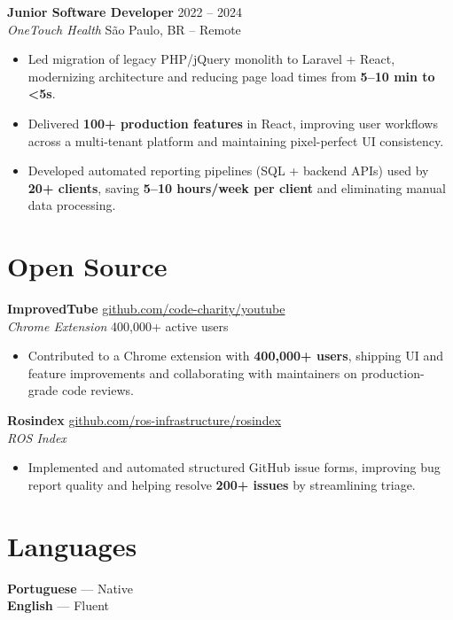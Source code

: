 \documentclass[11pt, a4paper]{article}
\begin{document}
\textbf{Junior Software Developer} \hfill 2022 -- 2024 \\
\textit{OneTouch Health} \hfill S\~{a}o Paulo, BR -- Remote

\begin{itemize}
    \item Led migration of legacy PHP/jQuery monolith to Laravel + React, modernizing architecture and reducing page load times from \textbf{5--10 min to <5s}.
    \item Delivered \textbf{100+ production features} in React, improving user workflows across a multi-tenant platform and maintaining pixel-perfect UI consistency.
    \item Developed automated reporting pipelines (SQL + backend APIs) used by \textbf{20+ clients}, saving \textbf{5--10 hours/week per client} and eliminating manual data processing.
\end{itemize}

\section{Open Source}

\textbf{ImprovedTube} \hfill \href{https://github.com/code-charity/youtube}{github.com/code-charity/youtube} \\
\textit{Chrome Extension} \quad \textcolor{subtle}{\small 400{,}000+ active users}

\begin{itemize}
    \item Contributed to a Chrome extension with \textbf{400,000+ users}, shipping UI and feature improvements and collaborating with maintainers on production-grade code reviews.
\end{itemize}

\vspace{2pt}
\textbf{Rosindex} \hfill \href{https://github.com/ros-infrastructure/rosindex}{github.com/ros-infrastructure/rosindex} \\
\textit{ROS Index}

\begin{itemize}
    \item Implemented and automated structured GitHub issue forms, improving bug report quality and helping resolve \textbf{200+ issues} by streamlining triage.
\end{itemize}

\section{Languages}
{\small \textbf{Portuguese} --- Native \\
\textbf{English} --- Fluent}
\end{document}
